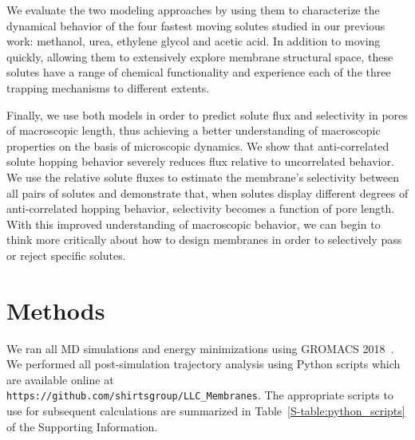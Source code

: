 \documentclass[aps,pre,preprint,groupedaddress]{revtex4-2}
\begin{document}
  We evaluate the two modeling approaches by using them to characterize the dynamical
  behavior of the four fastest moving solutes studied in our previous work:
  methanol, urea, ethylene glycol and acetic acid. In addition
  to moving quickly, allowing them to extensively explore membrane structural space,
  these solutes have a range of chemical functionality and experience each of the 
  three trapping mechanisms to different extents.
  
  Finally, we use both models in order to predict solute flux and selectivity in 
  pores of macroscopic length, thus achieving a better understanding
  of macroscopic properties on the basis of microscopic dynamics. We show that 
  anti-correlated solute hopping behavior severely reduces flux relative to 
  uncorrelated behavior. We use the relative solute fluxes to estimate the 
  membrane's selectivity between all pairs of solutes and demonstrate that, when 
  solutes display different degrees of anti-correlated hopping behavior, selectivity
  becomes a function of pore length. With this improved understanding of 
  macroscopic behavior, we can begin to think more critically about how to design 
  membranes in order to selectively pass or reject specific solutes.
  
  

  \section{Methods}
    
  We ran all MD simulations and energy minimizations using GROMACS 2018~\cite{bekker_gromacs:_1993,berendsen_gromacs:_1995,van_der_spoel_gromacs:_2005,hess_gromacs_2008}.  %
  We performed all post-simulation trajectory analysis using Python scripts which 
  are available online at \\ \texttt{https://github.com/shirtsgroup/LLC\_Membranes}.
  The appropriate scripts to use for subsequent calculations are summarized in 
  Table~\ref{S-table:python_scripts} of the Supporting Information.
  
\end{document}
